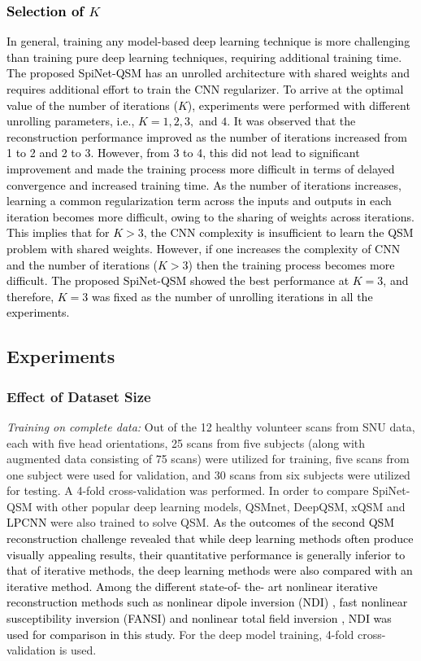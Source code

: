 \documentclass[sn-vancouver,Numbered]{sn-jnl}%
\begin{document}
\textcolor{black}{\subsubsection{Selection of $K$}}
\noindent \textcolor{black}{In general, training any model-based deep learning technique is more challenging than training pure deep learning techniques, requiring additional training time. The proposed SpiNet-QSM has an unrolled architecture with shared weights and requires additional effort to train the CNN regularizer. To arrive at the optimal value of the number of iterations ($K$), experiments were performed with different unrolling parameters, i.e., $K=1,2,3,$ and $4$. It was observed that the reconstruction performance improved as the number of iterations increased from 1 to 2 and 2 to 3. However, from 3 to 4, this did not lead to significant improvement and made the training process more difficult in terms of delayed convergence and increased training time. As the number of iterations increases, learning a common regularization term across the inputs and outputs in each iteration becomes more difficult, owing to the sharing of weights across iterations. This implies that for $K>3$, the CNN complexity is insufficient to learn the QSM problem with shared weights. However, if one increases the complexity of CNN and the number of iterations ($K>3$) then the training process becomes more difficult. The proposed SpiNet-QSM showed the best performance at $K=3$, and therefore, $K=3$ was fixed as the number of unrolling iterations in all the experiments.}\\

\subsection{Experiments}
\subsubsection{Effect of Dataset Size }
\textit{Training on complete data:} Out of the 12 healthy volunteer scans from SNU data, each with five head orientations, 25 scans from five subjects (along with augmented data consisting of 75 scans) were utilized for training, five scans from one subject were used for validation, and 30 scans from six subjects were utilized for testing. A 4-fold cross-validation was performed. In order to compare SpiNet-QSM with other popular deep learning models, QSMnet, DeepQSM, xQSM and \textcolor{black}{LPCNN} were also trained to solve QSM. \textcolor{black}{As the outcomes of the second QSM reconstruction challenge \cite{qsm2021qsm} revealed that while deep learning methods often produce visually appealing results, their quantitative performance is generally inferior to that of iterative methods, the deep learning methods were also compared with an iterative method. Among the different state-of- the- art nonlinear iterative reconstruction methods such as nonlinear dipole inversion (NDI) \cite{polak2020nonlinear}, fast nonlinear susceptibility inversion (FANSI)\cite{milovic2018fast} and nonlinear total field inversion \cite{nguyen2020quantitative}, NDI was used for comparison in this study.} For the deep model training, 4-fold cross-validation is used.
\end{document}

